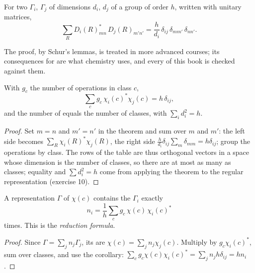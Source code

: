 \begin{theorem}\label{thm:b3:group-theory-applied:great-orthogonality}
For two  $\Gamma_i$, $\Gamma_j$ of dimensions $d_i$,
$d_j$ of a group of order $h$, written with unitary matrices,
\[
\sum_R D_i(R)_{mn}^*\,D_j(R)_{m'n'} = \frac{h}{d_i}\,\delta_{ij}\,\delta_{mm'}\,\delta_{nn'}.
\]
\end{theorem}
\admitted

The proof, by Schur's lemmas, is treated in more advanced courses; its
consequences for  are what chemistry uses, and every  of this book is checked against them.

\begin{corollary}\label{cor:b3:group-theory-applied:characters}
With $g_c$ the number of operations in class $c$,
\[
\sum_cg_c\,\chi_i(c)^*\chi_j(c) = h\,\delta_{ij},
\]
and the number of  equals the number of classes,
with $\sum_id_i^2 = h$.
\end{corollary}

\begin{proof}
Set $m = n$ and $m' = n'$ in the theorem and sum over $m$ and $m'$: the left
side becomes $\sum_R\chi_i(R)^*\chi_j(R)$, the right side $\frac{h}{d_i}\delta_{ij}
\sum_{m}\delta_{mm} = h\delta_{ij}$; group the operations by class. The rows of
the table are thus orthogonal vectors in a space whose dimension is the
number of classes, so there are at most as many  as classes; equality and $\sum d_i^2 = h$ come from applying
the theorem to the regular representation (exercise 10).
\end{proof}

\begin{theorem}\label{thm:b3:group-theory-applied:reduction}
A representation $\Gamma$ of  $\chi(c)$ contains the  $\Gamma_i$ exactly
\[
n_i = \frac1h\sum_cg_c\,\chi(c)\,\chi_i(c)^*
\]
times. This is the \emph{reduction formula}.
\end{theorem}

\begin{proof}
Since $\Gamma = \sum_jn_j\Gamma_j$, its  are $\chi(c) = \sum_jn_j\chi_j(c)$.
Multiply by $g_c\chi_i(c)^*$, sum over classes, and use the corollary:
$\sum_cg_c\chi(c)\chi_i(c)^* = \sum_jn_jh\delta_{ij} = hn_i$.
\end{proof}

